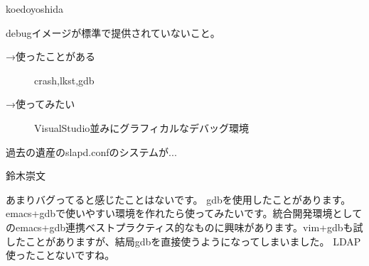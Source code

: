 \begin{prework}{ koedoyoshida }

debugイメージが標準で提供されていないこと。

\begin{description}
\item [→使ったことがある] crash,lkst,gdb
\item [→使ってみたい] VisualStudio並みにグラフィカルなデバッグ環境
\end{description}
過去の遺産のslapd.confのシステムが...
\end{prework}

\begin{prework}{ 鈴木崇文 }

あまりバグってると感じたことはないです。
 gdbを使用したことがあります。emacs+gdbで使いやすい環境を作れたら使ってみたいです。統合開発環境としてのemacs+gdb連携ベストプラクティス的なものに興味があります。vim+gdbも試したことがありますが、結局gdbを直接使うようになってしまいました。
LDAP使ったことないですね。
\end{prework}
